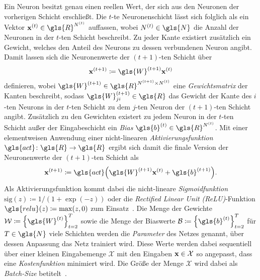 Ein Neuron besitzt genau einen reellen Wert, der sich aus den Neuronen der vorherigen Schicht erschließt.
Die $t$-te Neuronenschicht lässt sich folglich als ein Vektor $\ve{x}^{\left(t\right)} \in \gls{R}^{N^{\left(t\right)}}$ auffassen, wobei $N^{\left(t\right)} \in \gls{N}$ die Anzahl der Neuronen in der $t$-ten Schicht beschreibt.
Zu jeder Kante existiert zusätzlich ein Gewicht, welches den Anteil des Neurons zu dessen verbundenen Neuron angibt.
Damit lassen sich die Neuronenwerte der $\left(t+1\right)$-ten Schicht über
\begin{equation*}
  \ve{x}^{\left(t+1\right)} \coloneqq \gls{W}^{\left(t+1\right)}\ve{x}^{\left(t\right)}
\end{equation*}
definieren, wobei $\gls{W}^{\left(t+1\right)} \in \gls{R}^{N^{\left(t+1\right)} \times N^{\left(t\right)}}$ eine \emph{Gewichtsmatrix} der Kanten beschreibt, sodass $\gls{W}^{\left(t+1\right)}_{ji} \in \gls{R}$ das Gewicht der Kante des $i$-ten Neurons in der $t$-ten Schicht zu dem $j$-ten Neuron der $\left(t+1\right)$-ten Schicht angibt.
Zusätzlich zu den Gewichten existert zu jedem Neuron in der $t$-ten Schicht außer der Eingabeschicht ein \emph{Bias} $\gls{b}^{\left(t\right)} \in \gls{R}^{N^{\left(t\right)}}$.
Mit einer elementweisen Anwendung einer nicht-linearen \emph{Aktivierungsfunktion} $\gls{act} \colon \gls{R} \to \gls{R}$ ergibt sich damit die finale Version der Neuronenwerte der $\left(t+1\right)$-ten Schicht als
\begin{equation*}
  \ve{x}^{\left(t+1\right)} \coloneqq \gls{act} \left(\gls{W}^{\left(t+1\right)}\ve{x}^{\left(t\right)} + \gls{b}^{\left(t+1\right)} \right).
\end{equation*}
Als Aktivierungsfunktion kommt dabei \bspw{} die nicht-lineare \emph{Sigmoidfunktion} $\mathrm{sig}\left(z\right) \coloneqq 1 / \left(1 + \exp\left(-z\right)\right)$ oder die \emph{Rectified Linear Unit (ReLU)}-Funktion $\gls{relu}\left(z\right) \coloneqq \max \left(z, 0\right)$ zum Einsatz~\cite{Nielsen}.
Die Menge der Gewichte $\mathcal{W} \coloneqq {\left\{\gls{W}^{\left(t\right)}\right\}}_{t=2}^T$ sowie die Menge der Biaswerte $\mathcal{B} \coloneqq {\left\{\gls{b}^{\left(t\right)}\right\}}_{t=2}^T$ für $T \in \gls{N}$ viele Schichten werden die \emph{Parameter} des Netzes genannt, über dessen Anpassung das Netz trainiert wird.
Diese Werte werden dabei sequentiell über einer kleinen Eingabemenge $\mathcal{X}$ mit den Eingaben $\mathbf{x} \in \mathcal{X}$ so angepasst, dass eine \emph{Kostenfunktion} minimiert wird.
Die Größe der Menge $\mathcal{X}$ wird dabei als \emph{Batch-Size} betitelt~\cite{Nielsen}.
